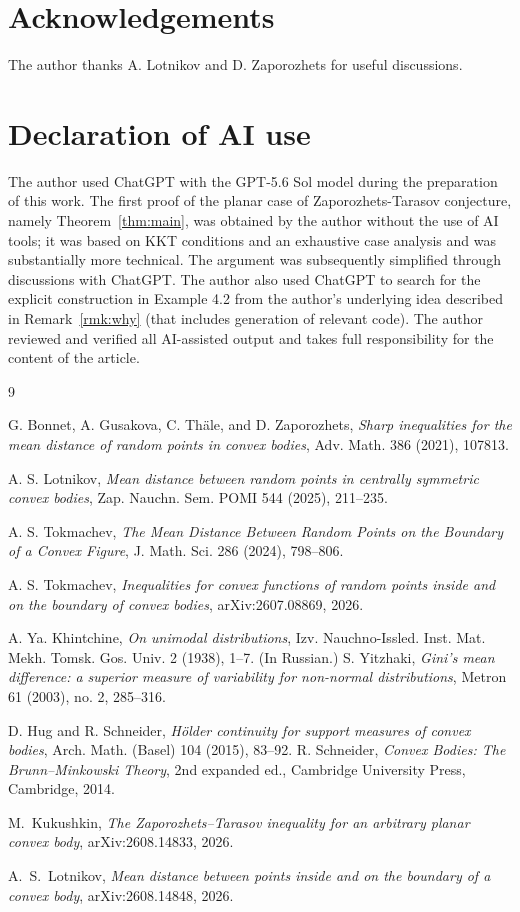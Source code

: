 \documentclass[final,12pt]{elsarticle}
\numberwithin{equation}{section}
\theoremstyle{remark}
\theoremstyle{definition}
\begin{document}
 \section{Acknowledgements}
 The author thanks A. Lotnikov and D. Zaporozhets for useful discussions.

 \section{Declaration of AI use}
 The author used ChatGPT with the GPT-5.6 Sol model during the preparation of
this work. The first proof of the planar case of Zaporozhets-Tarasov conjecture, namely Theorem~\ref{thm:main}, was obtained
by the author without the use of AI tools; it was based on KKT conditions and an
exhaustive case analysis and was substantially more technical. The argument was
subsequently simplified through discussions with ChatGPT. The author also used
ChatGPT to search for the explicit construction in Example 4.2 from the author's
underlying idea described in Remark~\ref{rmk:why} (that includes generation of relevant
code). The author reviewed and verified all AI-assisted output and takes full
responsibility for the content of the article.
\begin{thebibliography}{9}

G. Bonnet, A. Gusakova, C. Th\"ale, and D. Zaporozhets,
\emph{Sharp inequalities for the mean distance of random points in convex bodies},
Adv. Math. 386 (2021), 107813.

A. S. Lotnikov,
\emph{Mean distance between random points in centrally symmetric convex bodies},
Zap. Nauchn. Sem. POMI 544 (2025), 211--235.

A. S. Tokmachev,
\emph{The Mean Distance Between Random Points on the Boundary of a Convex Figure},
J. Math. Sci. 286 (2024), 798--806.

A. S. Tokmachev,
\emph{Inequalities for convex functions of random points inside and on the boundary of convex bodies},
arXiv:2607.08869, 2026.

A. Ya. Khintchine, \emph{On unimodal distributions},
Izv. Nauchno-Issled. Inst. Mat. Mekh. Tomsk. Gos. Univ. 2 (1938), 1–7. (In Russian.)
S. Yitzhaki, \emph{Gini's mean difference: a superior measure of variability for non-normal distributions}, Metron 61 (2003), no. 2, 285–316.

 D. Hug and R. Schneider,
\emph{H\"older continuity for support measures of convex bodies},
Arch. Math. (Basel) 104 (2015), 83--92.
R. Schneider,\emph{ Convex Bodies: The Brunn–Minkowski Theory}, 2nd expanded ed., Cambridge University Press, Cambridge, 2014.

M.~Kukushkin,
\newblock \emph{The Zaporozhets--Tarasov inequality for an arbitrary planar convex body},
\newblock arXiv:2608.14833, 2026.

A.~S.~Lotnikov,
\newblock \emph{Mean distance between points inside and on the boundary of a convex body},
\newblock arXiv:2608.14848, 2026.
\end{thebibliography}
\end{document}
